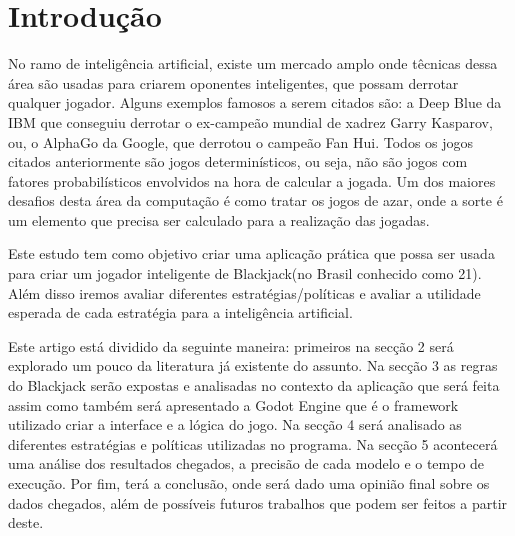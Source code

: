 \section{Introdução}


    No ramo de inteligência artificial, existe um mercado amplo onde 
    têcnicas dessa área são usadas para criarem oponentes inteligentes, 
    que possam derrotar qualquer jogador. Alguns exemplos famosos a serem 
    citados são: a Deep Blue da IBM que conseguiu derrotar o ex-campeão 
    mundial de xadrez Garry Kasparov, ou, o AlphaGo da Google, que derrotou 
    o campeão Fan Hui. Todos os jogos citados anteriormente são jogos determinísticos, 
    ou seja, não são jogos com fatores probabilísticos envolvidos na hora de calcular 
    a jogada. Um dos maiores desafios desta área da computação
    é como tratar os jogos de azar, onde a sorte é um elemento que 
    precisa ser calculado para a realização das jogadas.

    Este estudo tem como objetivo criar uma aplicação prática que 
    possa ser usada para criar um jogador inteligente de Blackjack(no 
    Brasil conhecido como 21). Além disso iremos avaliar diferentes 
    estratégias/políticas e avaliar a utilidade esperada de cada estratégia 
    para a inteligência artificial.

    Este artigo está dividido da seguinte maneira: primeiros na secção 2 
    será explorado um pouco da literatura já existente do assunto. Na secção 
    3 as regras do Blackjack serão expostas e analisadas no contexto da aplicação 
    que será feita assim como também será apresentado a Godot Engine que é o framework utilizado 
    criar a interface e a lógica do jogo. Na secção 4 será analisado as diferentes 
    estratégias e políticas utilizadas no programa. Na secção 5 acontecerá uma análise 
    dos resultados chegados, a precisão de cada modelo e o tempo de execução. Por fim, 
    terá a conclusão, onde será dado uma opinião final sobre os dados chegados, além de possíveis 
    futuros trabalhos que podem ser feitos a partir deste.